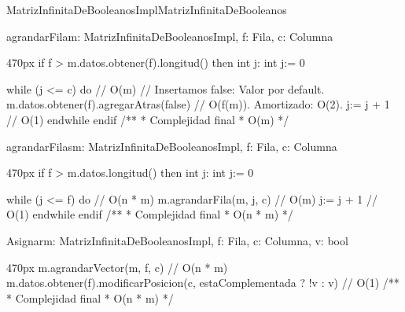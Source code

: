 \documentclass[10pt,a4paper]{article}
\begin{document}
\vspace{1em}
\vspace{1em}
\begin{ModuloImplements}{MatrizInfinitaDeBooleanosImpl}{MatrizInfinitaDeBooleanos}
  \begin{Vars}
  \end{Vars}

  \begin{proc}{agrandarFila}{\Inout m: MatrizInfinitaDeBooleanosImpl, \In f: Fila, \In c: Columna}{}
    \begin{ImplementationCode}{470px}
      if f > m.datos.obtener(f).longitud() then
        int j: int
            j:= 0
        
        while (j <= c) do // O(m)
          // Insertamos false: Valor por default.
          m.datos.obtener(f).agregarAtras(false) // O(f(m)). Amortizado: O(2).
          j:= j + 1 // O(1)
        endwhile
      endif
      /**
       * Complejidad final
       * O(m)
       */
    \end{ImplementationCode}
  \end{proc}

  \begin{proc}{agrandarFilas}{\Inout m: MatrizInfinitaDeBooleanosImpl, \In f: Fila, \In c: Columna}{}
    \begin{ImplementationCode}{470px}
      if f > m.datos.longitud() then
        int j: int
            j:= 0
        
        while (j <= f) do         // O(n * m)
          m.agrandarFila(m, j, c) // O(m)
          j:= j + 1 // O(1)
        endwhile
      endif
      /**
       * Complejidad final
       * O(n * m)
       */
    \end{ImplementationCode}
  \end{proc}


  \begin{proc}{Asignar}{\Inout m: MatrizInfinitaDeBooleanosImpl, \In f: Fila, \In c: Columna, \In v: bool}{}
    \begin{ImplementationCode}{470px}
      m.agrandarVector(m, f, c)                    // O(n * m)
      m.datos.obtener(f).modificarPosicion(c, estaComplementada ? !v : v) // O(1)
      /**
       * Complejidad final
       * O(n * m)
       */
    \end{ImplementationCode}
  \end{proc}


\end{ModuloImplements}
\end{document}
